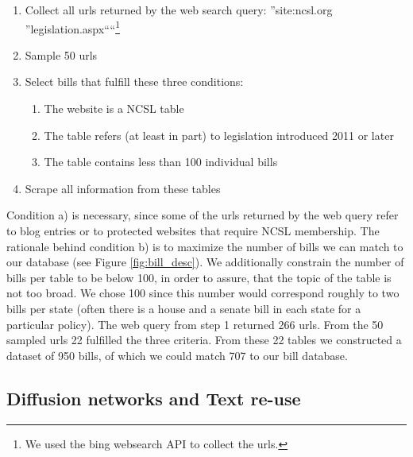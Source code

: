\documentclass[12pt]{article} %
\begin{document}
\begin{singlespacing}

\begin{enumerate}
    \item Collect all urls returned by the web search query: ''site:ncsl.org ''legislation.aspx````\footnote{We used the bing websearch API to collect the urls.}
    \item Sample 50 urls
    \item Select bills that fulfill these three conditions:
        \begin{enumerate}
            \item The website is a NCSL table
            \item The table refers (at least in part) to legislation introduced 2011 or later
            \item The table contains less than 100 individual bills
        \end{enumerate}
    \item Scrape all information from these tables
\end{enumerate}

\end{singlespacing}

Condition a) is necessary, since some of the urls returned by the web query refer to blog entries or to protected websites that require NCSL membership. The rationale behind condition b) is to maximize the number of bills we can match to our database (see Figure \ref{fig:bill_desc}). We additionally constrain the number of bills per table to be below 100, in order to assure, that the topic of the table is not too broad. We chose 100 since this number would correspond roughly to two bills per state (often there is a house and a senate bill in each state for a particular policy).
The web query from step 1 returned 266 urls. From the 50 sampled urls 22 fulfilled the three criteria. From these 22 tables we constructed a dataset of 950 bills, of which we could match 707 to our bill database.






\subsection{Diffusion networks and Text re-use}
\end{document}
